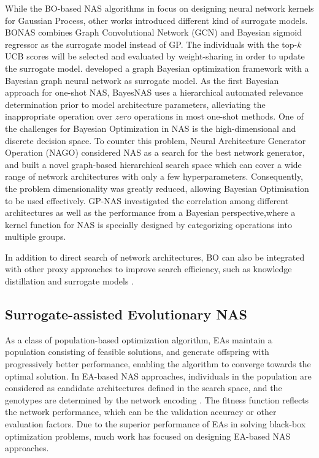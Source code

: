 \documentclass[journal]{IEEEtran}
\begin{document}
While the BO-based NAS algorithms in \cite{jin2019auto, kandasamy2018neural, ru2020interpretable} focus on designing neural network kernels for Gaussian Process, other works introduced different kind of surrogate models. BONAS \cite{shi2020bridging} combines Graph Convolutional Network (GCN) \cite{kipf2016semi} and Bayesian sigmoid regressor as the surrogate model instead of GP. The individuals with the top-$k$ UCB scores will be selected and evaluated by weight-sharing in order to update the surrogate model. \cite{ma2019deep} developed a graph Bayesian optimization framework with a Bayesian graph neural network as surrogate model.
As the first Bayesian approach for one-shot NAS, BayesNAS \cite{zhou2019bayesnas} uses a hierarchical automated relevance determination prior to model architecture parameters, alleviating the inappropriate operation over $zero$ operations in most one-shot methods. 
One of the challenges for Bayesian Optimization in NAS is the high-dimensional and discrete decision space. To counter this problem, Neural Architecture Generator Operation (NAGO) \cite{ru2020neural} considered NAS as a search for the best network generator, and built a novel graph-based hierarchical search space which can cover a wide range of network architectures with only a few hyperparameters. Consequently, the problem dimensionality was greatly reduced, allowing Bayesian Optimisation to be used effectively. GP-NAS \cite{li2020gp} investigated the correlation among different architectures as well as the performance from a Bayesian perspective,where a kernel function for NAS is specially designed by categorizing operations into multiple groups.

In addition to direct search of network architectures, BO can also be integrated with other proxy approaches to improve search efficiency, such as knowledge distillation \cite{trofimov2020multi} and surrogate models \cite{wei2020npenas, cho2022b2ea}.


\subsection{Surrogate-assisted Evolutionary NAS}

As a class of population-based optimization algorithm, EAs maintain a population consisting of feasible solutions, and generate offspring with progressively better performance, enabling the algorithm to converge towards the optimal solution. In EA-based NAS approaches, individuals in the population are considered as candidate architectures defined in the search space, and the genotypes are determined by the network encoding \cite{white2020study}. The fitness function reflects the network performance, which can be the validation accuracy or other evaluation factors. Due to the superior performance of EAs in solving black-box optimization problems, much work has focused on designing EA-based NAS approaches.
\end{document}
